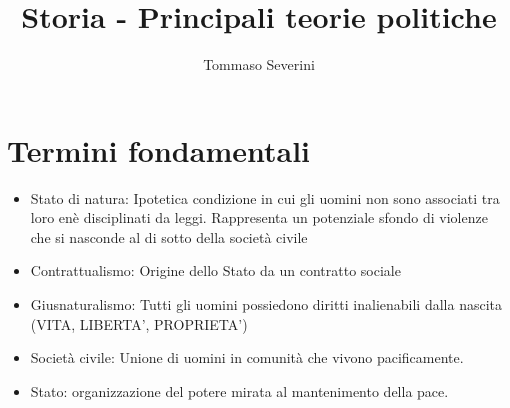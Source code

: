 \documentclass[10pt,a4paper]{article}
\author{Tommaso Severini}
\title{Storia - Principali teorie politiche}
\begin{document}
	\maketitle
	
	\section*{Termini fondamentali}
	\begin{itemize}
		\item Stato di natura: Ipotetica condizione in cui gli uomini non sono associati tra loro enè disciplinati da leggi. Rappresenta un potenziale sfondo di violenze che si nasconde al di sotto della società civile
		\item Contrattualismo: Origine dello Stato da un contratto sociale
		\item Giusnaturalismo: Tutti gli uomini possiedono diritti inalienabili dalla nascita (VITA, LIBERTA', PROPRIETA')
		\item Società civile: Unione di uomini in comunità che vivono pacificamente.
		\item Stato: organizzazione del potere mirata al mantenimento della pace.
	\end{itemize}
\end{document}
